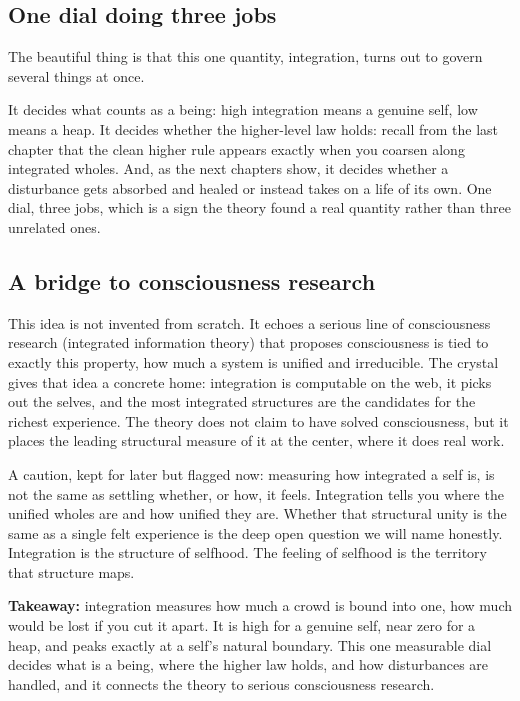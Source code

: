\subsection{One dial doing three jobs}

The beautiful thing is that this one quantity, integration, turns out to govern several things at once.

It decides what counts as a being: high integration means a genuine self, low means a heap. It decides whether the higher-level law holds: recall from the last chapter that the clean higher rule appears exactly when you coarsen along integrated wholes. And, as the next chapters show, it decides whether a disturbance gets absorbed and healed or instead takes on a life of its own. One dial, three jobs, which is a sign the theory found a real quantity rather than three unrelated ones.

\subsection{A bridge to consciousness research}

This idea is not invented from scratch. It echoes a serious line of consciousness research (integrated information theory) that proposes consciousness is tied to exactly this property, how much a system is unified and irreducible. The crystal gives that idea a concrete home: integration is computable on the web, it picks out the selves, and the most integrated structures are the candidates for the richest experience. The theory does not claim to have solved consciousness, but it places the leading structural measure of it at the center, where it does real work.

A caution, kept for later but flagged now: measuring how integrated a self is, is not the same as settling whether, or how, it feels. Integration tells you where the unified wholes are and how unified they are. Whether that structural unity is the same as a single felt experience is the deep open question we will name honestly. Integration is the structure of selfhood. The feeling of selfhood is the territory that structure maps.

\textbf{Takeaway:} integration measures how much a crowd is bound into one, how much would be lost if you cut it apart. It is high for a genuine self, near zero for a heap, and peaks exactly at a self's natural boundary. This one measurable dial decides what is a being, where the higher law holds, and how disturbances are handled, and it connects the theory to serious consciousness research.
